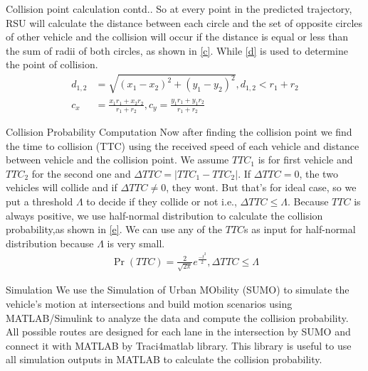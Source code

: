 \documentclass{beamer}
\providecommand{\pr}[1]{\ensuremath{\Pr\left(#1\right)}}
\begin{document}
\begin{frame}{Collision point calculation contd..}
    So at every point in the predicted trajectory, RSU will calculate the distance between each circle and the set of opposite circles of other vehicle and the  collision will occur if the distance is equal or less than the sum of radii of both circles,  as shown in \eqref{c}. While \eqref{d} is used to determine the point of collision.
    \begin{align}
        d_{1,2}&=\sqrt{(x_1-x_2)^2+(y_1-y_2)^2}, d_{1,2}<r_1+r_2
        \label{c}\\
        c_x&=\frac{x_1r_1+x_2r_2}{r_1+r_2},c_y=\frac{y_1r_1+y_1r_2}{r_1+r_2}
        \label{d}
    \end{align}
\end{frame}
\begin{frame}{Collision Probability Computation}
    Now after finding the collision point we find the time to collision (TTC) using the received speed of each vehicle and distance between vehicle and the collision point. We assume $TTC_1$ is for first vehicle and $TTC_2$ for the second one and $\Delta TTC=\lvert TTC_1-TTC_2\rvert$. If $\Delta TTC=0$, the two vehicles will collide and if $\Delta TTC\neq0$, they wont. But that's for ideal case, so we put a threshold $\Lambda$ to decide if they collide or not i.e., $\Delta TTC\leq\Lambda$. Because $TTC$ is always positive, we use half-normal distribution to calculate the collision probability,as shown in \eqref{e}. We can use any of the $TTC$s as input for half-normal distribution because $\Lambda$ is very small. 
    \begin{align}
        \pr{TTC}=\frac{2}{\sqrt{2\pi}}e^{\frac{-t^2}{2}},\Delta TTC\leq\Lambda
        \label{e}
    \end{align}
\end{frame}
\begin{frame}{Simulation}
    We  use  the  Simulation of Urban MObility  (SUMO) to simulate the vehicle’s motion at intersections and build motion scenarios using MATLAB/Simulink to analyze the data and compute the collision probability. All possible routes are designed for each lane in the intersection by SUMO and connect it with MATLAB by Traci4matlab library. This library is useful to use all simulation outputs in MATLAB to calculate the collision probability.
\end{frame}
\end{document}
